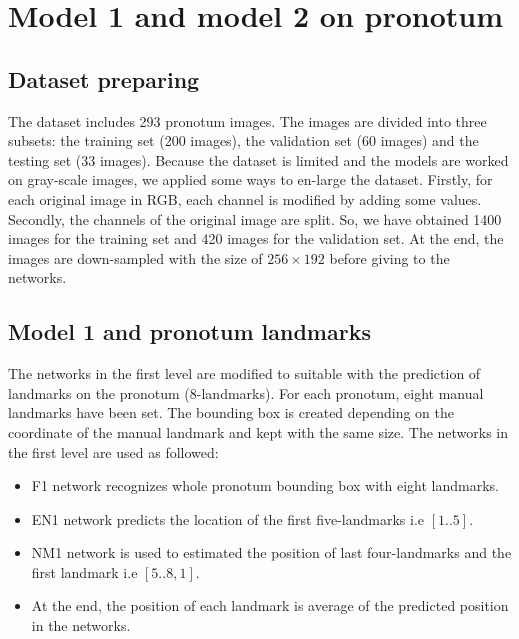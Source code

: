 \documentclass[12pt,a4paper]{article}
\begin{document}
\section{Model 1 and model 2 on pronotum}
\subsection{Dataset preparing}
The dataset includes 293 pronotum images. The images are divided into three subsets: the training set (200 images), the validation set (60 images) and the testing set (33 images). Because the dataset is limited and the models are worked on gray-scale images, we applied some ways to en-large the dataset. Firstly, for each original image in RGB, each channel is modified by adding some values. Secondly, the channels of the original image are split. So, we have obtained 1400 images for the training set and 420 images for the validation set. At the end, the images are down-sampled with the  size of $256 \times 192$ before giving to the networks.

\subsection{Model 1 and pronotum landmarks}
The networks in the first level are modified to suitable with the prediction of landmarks on the pronotum (8-landmarks). For each pronotum, eight manual landmarks have been set. The bounding box is created depending on the coordinate of the manual landmark and kept with the same size. The networks in the first level are used as followed:
\begin{itemize}
	\item F1 network recognizes whole pronotum bounding box with eight landmarks.
	\item EN1 network predicts the location of the first five-landmarks i.e $[1..5]$.
	\item NM1 network is used to estimated the position of last four-landmarks and the first landmark i.e $[5..8,1]$.
	\item At the end, the position of each landmark is average of the predicted position in the networks.
\end{itemize} 
\end{document}
